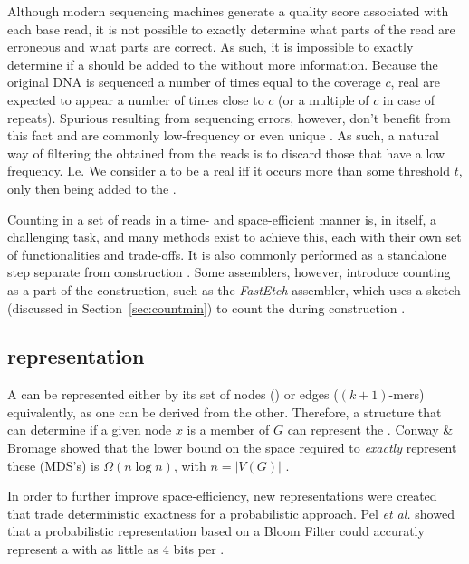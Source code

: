 Although modern sequencing machines generate a quality score associated with each base read, it is not possible to exactly determine what parts of the read are erroneous and what parts are correct. As such, it is impossible to exactly determine if a \kmer should be added to the \dBG without more information. Because the original DNA is sequenced a number of times equal to the coverage $c$, real  are expected to appear a number of times close to $c$ (or a multiple of $c$ in case of repeats). Spurious  resulting from sequencing errors, however, don't benefit from this fact and are commonly low-frequency or even unique \cite{Conway2011} \cite{Zhang2014} \cite{Ghosh2019}. As such, a natural way of filtering the  obtained from the reads is to discard those that have a low frequency. I.e. We consider a \kmer to be a real \kmer iff it occurs more than some threshold $t$, only then being added to the \dBG.

Counting  in a set of reads in a time- and space-efficient manner is, in itself, a challenging task, and many methods exist to achieve this, each with their own set of functionalities and trade-offs. It is also commonly performed as a standalone step separate from \dBG construction \cite{Zhang2014}. Some assemblers, however, introduce \kmer counting as a part of the \dBG construction, such as the \emph{FastEtch} assembler, which uses a \cm sketch (discussed in Section~\ref{sec:countmin}) to count the  during \dBG construction \cite{Ghosh2019}.

\subsection{\dBG representation}
\label{subsec:dBG-representation}

A \dBG can be represented either by its set of nodes () or edges ($(k+1)$-mers) equivalently, as one can be derived from the other. Therefore, a structure that can determine if a given node $x$ is a member of $G$ can represent the \dBG. Conway \& Bromage showed that the lower bound on the space required to \emph{exactly} represent these  (MDS's) is $\Omega(n \log n)$, with $n=|V(G)|$ \cite{Conway2011}.

In order to further improve space-efficiency, new representations were created that trade deterministic exactness for a probabilistic approach. Pel \emph{et al.} showed that a probabilistic representation based on a Bloom Filter could accuratly represent a \dBG with as little as 4 bits per \kmer \cite{Pell2012}. 

